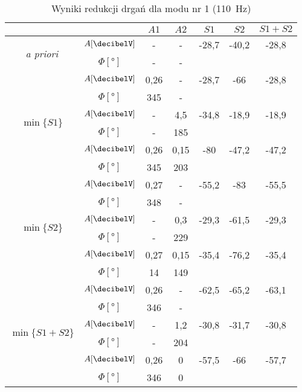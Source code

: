 \documentclass[polish,a4paper,11pt]{mwart}
\begin{document}
  \begin{table}[!tbh]
    \centering
    \caption{Wyniki redukcji drgań dla modu nr 1 (\SI{110}{\hertz})}
    \label{tab:red1}
    \begin{tabular}{|c|c|c|c|c|c|c|}
      \cline{3-7}
      \multicolumn{2}{c|}{}&$A1$&$A2$&$S1$&$S2$&$S1+S2$\\\hline
      \multirow{2}{*}{\textit{a priori}} &   $A [\si{\decibelV}]$ & - & - & -28,7 & -40,2 & -28,8\\\cline{2-7}
					 &$\Phi [\si{\degree}]$ & - & - & \multicolumn{3}{c}{}\\\hline
      \multirow{6}{*}{$\min\{S1\}$}      &   $A [\si{\decibelV}]$ & 0,26 & - & -28,7 & -66 & -28,8\\\cline{2-7}
					 &$\Phi [\si{\degree}]$ & 345 & - & \multicolumn{3}{c}{}\\\cline{2-7}
					 &   $A [\si{\decibelV}]$ & - & 4,5 & -34,8 & -18,9 & -18,9\\\cline{2-7}
					 &$\Phi [\si{\degree}]$ & - & 185 & \multicolumn{3}{c}{}\\\cline{2-7}
					 &   $A [\si{\decibelV}]$ & 0,26 & 0,15 & -80 & -47,2 & -47,2\\\cline{2-7}
					 &$\Phi [\si{\degree}]$ & 345 & 203 & \multicolumn{3}{c}{}\\\hline
      \multirow{6}{*}{$\min\{S2\}$}      &   $A [\si{\decibelV}]$ & 0,27 & - & -55,2 & -83 & -55,5\\\cline{2-7}
					 &$\Phi [\si{\degree}]$ & 348 & - & \multicolumn{3}{c}{}\\\cline{2-7}
					 &   $A [\si{\decibelV}]$ & - & 0,3 & -29,3 & -61,5 & -29,3\\\cline{2-7}
					 &$\Phi [\si{\degree}]$ & - & 229 & \multicolumn{3}{c}{}\\\cline{2-7}
					 &   $A [\si{\decibelV}]$ & 0,27 & 0,15 & -35,4 & -76,2 & -35,4\\\cline{2-7}
					 &$\Phi [\si{\degree}]$ & 14 & 149 & \multicolumn{3}{c}{}\\\hline
      \multirow{6}{*}{$\min\{S1+S2\}$}   &   $A [\si{\decibelV}]$ & 0,26 & - & -62,5 & -65,2 & -63,1\\\cline{2-7}
					 &$\Phi [\si{\degree}]$ & 346 & - & \multicolumn{3}{c}{}\\\cline{2-7}
					 &   $A [\si{\decibelV}]$ & - & 1,2 & -30,8 & -31,7 & -30,8\\\cline{2-7}
					 &$\Phi [\si{\degree}]$ & - & 204 & \multicolumn{3}{c}{}\\\cline{2-7}
					 &   $A [\si{\decibelV}]$ & 0,26 & 0 & -57,5 & -66 & -57,7\\\cline{2-7}
					 &$\Phi [\si{\degree}]$ & 346 & 0 & \multicolumn{3}{c}{}\\\cline{1-4}
    \end{tabular}
  \end{table}
\end{document}
